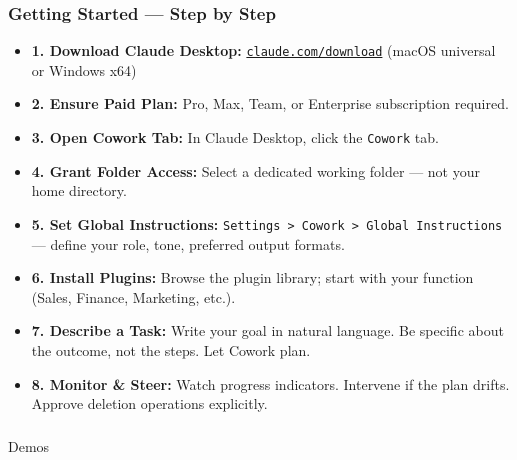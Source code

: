 \begin{frame}[fragile]\frametitle{Getting Started — Step by Step}
  \begin{itemize}
    \item \textbf{1. Download Claude Desktop:} \href{https://claude.com/download}{\texttt{claude.com/download}} (macOS universal or Windows x64)
    \item \textbf{2. Ensure Paid Plan:} Pro, Max, Team, or Enterprise subscription required.
    \item \textbf{3. Open Cowork Tab:} In Claude Desktop, click the \texttt{Cowork} tab.
    \item \textbf{4. Grant Folder Access:} Select a dedicated working folder — not your home directory.
    \item \textbf{5. Set Global Instructions:} \texttt{Settings > Cowork > Global Instructions} — define your role, tone, preferred output formats.
    \item \textbf{6. Install Plugins:} Browse the plugin library; start with your function (Sales, Finance, Marketing, etc.).
    \item \textbf{7. Describe a Task:} Write your goal in natural language. Be specific about the outcome, not the steps. Let Cowork plan.
    \item \textbf{8. Monitor \& Steer:} Watch progress indicators. Intervene if the plan drifts. Approve deletion operations explicitly.
  \end{itemize}
\end{frame}

\begin{frame}[fragile]\frametitle{}

\begin{center}
{\Large Demos}
\end{center}
\end{frame}

